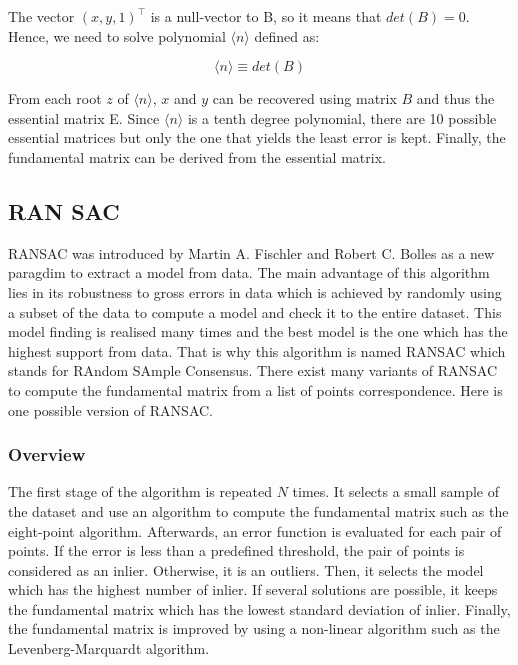 \documentclass[11pt]{report}
\begin{document}
The vector $(x, y, 1)^\top$ is a null-vector to B, so it means that $det(B) = 0$. Hence, we need to solve polynomial $\langle n\rangle$ defined as:

\begin{equation}
  \langle n \rangle \equiv det(B)
\end{equation}

From each root $z$ of $\langle n\rangle$, $x$ and $y$ can be recovered using matrix $B$ and thus the essential matrix E. Since $\langle n \rangle$ is a tenth degree polynomial, there are 10 possible essential matrices but only the one that yields the least error is kept. Finally, the fundamental matrix can be derived from the essential matrix.


\subsection{RAN SAC}

RANSAC\cite{Ransac81} was introduced by Martin A. Fischler and Robert C. Bolles as a new paragdim to extract a model from data. The main advantage of this algorithm lies in its robustness to gross errors in data which is achieved by randomly using a subset of the data to compute a model and check it to the entire dataset. This model finding is realised many times and the best model is the one which has the highest support from data. That is why this algorithm is named RANSAC which stands for RAndom SAmple Consensus. 
There exist many variants of RANSAC to compute the fundamental matrix from a list of points correspondence. Here is one possible version of RANSAC.

\subsubsection{Overview}

The first stage of the algorithm is repeated $N$ times. It selects a small sample of the dataset and use an algorithm to compute the fundamental matrix such as the eight-point algorithm. Afterwards, an error function is evaluated for each pair of points. If the error is less than a predefined threshold, the pair of points is considered as an inlier. Otherwise, it is an outliers. Then, it selects the model which has the highest number of inlier. If several solutions are possible, it keeps the fundamental matrix which has the lowest standard deviation of inlier. Finally, the fundamental matrix is improved by using a non-linear algorithm such as the Levenberg-Marquardt algorithm.
\end{document}
